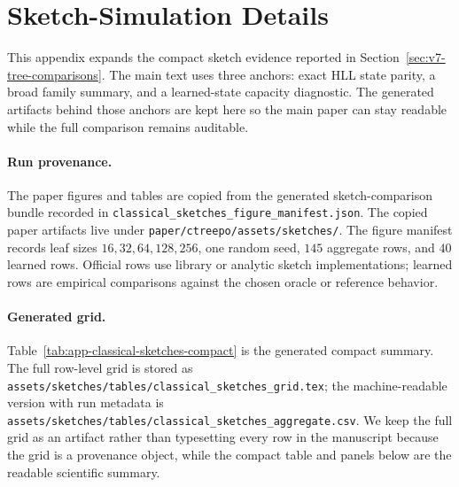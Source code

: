 \section{Sketch-Simulation Details}
\label{app:sketch-simulations}

This appendix expands the compact sketch evidence reported in
Section~\ref{sec:v7-tree-comparisons}. The main text uses three anchors:
exact HLL state parity, a broad family summary, and a learned-state
capacity diagnostic. The generated artifacts behind those anchors are kept
here so the main paper can stay readable while the full comparison remains
auditable.

\paragraph{Run provenance.}
The paper figures and tables are copied from the generated sketch-comparison
bundle recorded in
\texttt{classical\_sketches\_figure\_manifest.json}. The copied paper
artifacts live under
\texttt{paper/ctreepo/assets/sketches/}. The figure manifest records leaf
sizes \(16,32,64,128,256\), one random seed, \(145\) aggregate rows, and
\(40\) learned rows.
Official rows use library or analytic sketch implementations; learned rows
are empirical comparisons against the chosen oracle or reference behavior.

\paragraph{Generated grid.}
Table~\ref{tab:app-classical-sketches-compact} is the generated compact
summary. The full row-level grid is stored as
\texttt{assets/sketches/tables/classical\_sketches\_grid.tex}; the
machine-readable version with run metadata is
\texttt{assets/sketches/tables/classical\_sketches\_aggregate.csv}. We keep
the full grid as an artifact rather than typesetting every row in the
manuscript because the grid is a provenance object, while the compact table
and panels below are the readable scientific summary.

\begin{table}[p]
\centering
\scriptsize
\resizebox{\linewidth}{!}{}
\caption{\textbf{Generated compact sketch grid.} Official rows are
reference sketch reductions or controls. Learned rows are empirical
approximations in the chosen state/query class, not claims of recovering the
library implementation.}
\label{tab:app-classical-sketches-compact}
\end{table}

